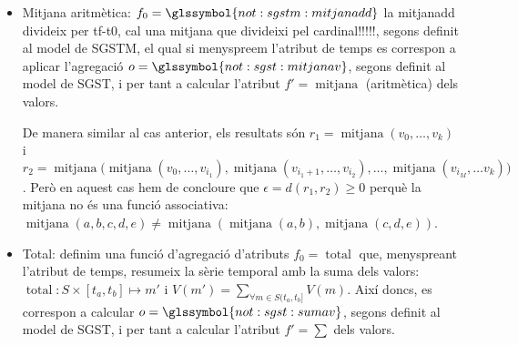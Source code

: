 \begin{example}
\begin{itemize}
    Podem concloure que en aquest cas $r_1=r_2$, i per tant
    $\epsilon=d(r_1,r_2)=0$ , perquè $\max(v_0,\dotsc, v_k) =
    \max\big( \max(v_0,\dotsc,v_{i_1}),
    \max(v_{i_1+1},\dotsc,v_{i_2}), \dotsc, \max(v_{i_M}, \dotsc v_k)
    \big)$ i $\max$ és una funció associativa: $\max(a,b,c,d,e) = \max(
    \max(a,b), \max(c,d,e))$.

    En aquest exemple hem menyspreat els temps resultants de
    l'agregació. És a dir, $r_1$ és correspon amb una o més d'una
    mesura $m_a\in S: V(m_a)=r_1$ i de la mateixa manera $m_b\in S':
    V(m_b)=r_2$ on hem conclòs que $V(m_a)=V(m_b)$. Això no obstant,
    en general els temps d'aquestes mesures no es correspondran,
    $T(m_a)\neq T(m_b)$ perquè $f_0=\glssymbol{not:sgstm:maxdd}$
    resumeix els atributs de temps segons l'interval de consolidació i
    al marge del resum de la informació en els valors.



\item   Mitjana aritmètica:
  $f_0=\glssymbol{not:sgstm:mitjanadd}$ la mitjanadd
  divideix per tf-t0, cal una mitjana que divideixi pel
  cardinal!!!!!, segons definit al model de
  \gls{SGSTM}, el qual si menyspreem l'atribut de temps es correspon a
  aplicar l'agregació $o=\glssymbol{not:sgst:mitjanav}$, segons
  definit al model de \gls{SGST}, i per tant a calcular l'atribut
  $f'=\operatorname{mitjana}$ (aritmètica) dels valors.

    De manera similar al cas anterior, els resultats són
    $r_1=\operatorname{mitjana}(v_0,\dotsc, v_k)$ i
    $r_2=\operatorname{mitjana}\big(
    \operatorname{mitjana}(v_0,\dotsc,v_{i_1}),
    \operatorname{mitjana}(v_{i_1+1},\dotsc,v_{i_2}), \dotsc,
    \operatorname{mitjana}(v_{i_M}, \dotsc v_k) \big)$.  Però en
    aquest cas hem de concloure que $\epsilon=d(r_1,r_2)\geq 0$ perquè
    la mitjana no és una funció associativa:
    $\operatorname{mitjana}(a,b,c,d,e) \neq \operatorname{mitjana}(
    \operatorname{mitjana}(a,b), \operatorname{mitjana}(c,d,e))$.
 


  \item Total: definim una funció d'agregació d'atributs
    $f_0=\operatorname{total}$ que, menyspreant l'atribut de temps,
    resumeix la sèrie temporal amb la suma dels valors:
    $\operatorname{total}: S \times [t_a,t_b] \mapsto m'$ i $V(m') =
    \sum\limits_{\forall m\in S(t_a,t_b]} V(m)$. Així doncs, es
    correspon a calcular $o=\glssymbol{not:sgst:sumav}$, segons
    definit al model de \gls{SGST}, i per tant a calcular l'atribut
    $f'=\sum$ dels valors.


\end{itemize}
\end{example}
